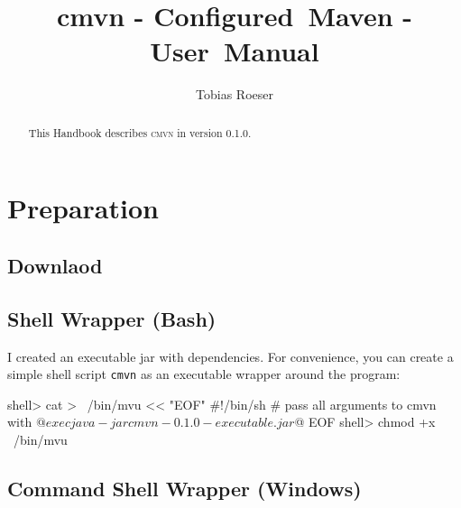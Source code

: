 \documentclass[a4paper,11pt,english,oneside,halfparskip]{scrartcl}
\title{cmvn - Configured~Maven - User~Manual}
\author{Tobias Roeser}
\newcommand{\CMVN}{\textsc{\small{}cmvn}}
\newcommand{\VERSION}{0.1.0}
\newcommand{\code}[1]{\texttt{#1}}
\begin{document}
\renewcommand{\labelitemi}{$\triangleright$}

\maketitle

\begin{abstract}
This Handbook describes \CMVN{} in version \VERSION{}.

\end{abstract}

\ifpdf{}\fi
\tableofcontents

\section{Preparation}

\subsection{Downlaod}

\subsection{Shell Wrapper (Bash)}


I created an executable jar with dependencies. For convenience, you can create a simple shell script \code{cmvn} as an executable wrapper around the program:

\begin{Cmdline}[caption={Shell wrapper \code{mvu}}]
shell> cat > ~/bin/mvu << "EOF"
#!/bin/sh
# pass all arguments to cmvn with $@
exec java -jar cmvn-0.1.0-executable.jar $@
EOF
shell> chmod +x ~/bin/mvu
\end{Cmdline}

\subsection{Command Shell Wrapper (Windows)}
\end{document}
